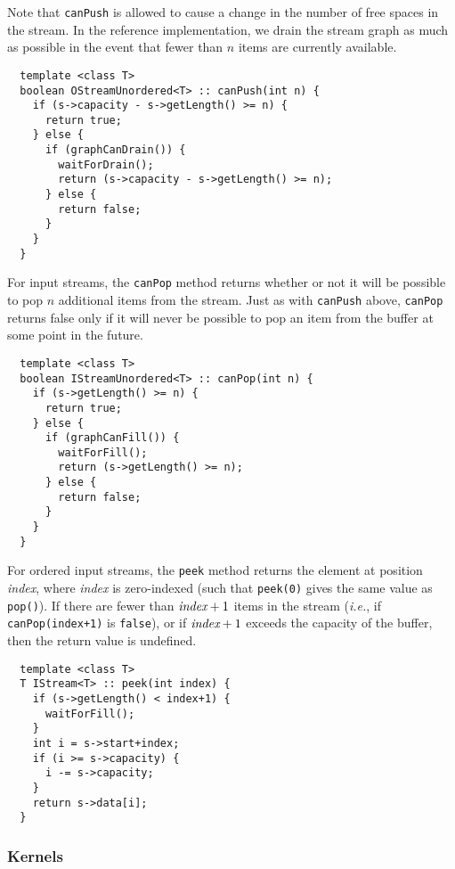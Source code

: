 Note that {\tt canPush} is allowed to cause a change in the number of
free spaces in the stream.  In the reference implementation, we drain
the stream graph as much as possible in the event that fewer than $n$
items are currently available.

{\small
\begin{verbatim}
  template <class T>
  boolean OStreamUnordered<T> :: canPush(int n) {
    if (s->capacity - s->getLength() >= n) {
      return true;
    } else {
      if (graphCanDrain()) {
        waitForDrain();
        return (s->capacity - s->getLength() >= n);
      } else {
        return false;
      }
    }
  }
\end{verbatim}}

 For input streams, the {\tt canPop} method returns
whether or not it will be possible to pop $n$ additional items from
the stream.  Just as with {\tt canPush} above, {\tt canPop} returns
false only if it will never be possible to pop an item from the buffer
at some point in the future.

{\small
\begin{verbatim}
  template <class T>
  boolean IStreamUnordered<T> :: canPop(int n) {
    if (s->getLength() >= n) {
      return true;
    } else {
      if (graphCanFill()) {
        waitForFill();
        return (s->getLength() >= n);
      } else {
        return false;
      }
    }
  }
\end{verbatim}}

 For ordered input streams, the {\tt peek} method returns
the element at position {\it index}, where {\it index} is zero-indexed
(such that {\tt peek(0)} gives the same value as {\tt pop()}).  If
there are fewer than $\mbox{\it index}+1$ items in the stream ({\it i.e.},
if {\tt canPop(index+1)} is {\tt false}), or if $\mbox{\it index}+1$ exceeds
the capacity of the buffer, then the return value is undefined.

{\small
\begin{verbatim}
  template <class T>
  T IStream<T> :: peek(int index) {
    if (s->getLength() < index+1) {
      waitForFill();
    }
    int i = s->start+index;
    if (i >= s->capacity) {
      i -= s->capacity;
    }
    return s->data[i];
  }
\end{verbatim}}

\subsubsection{Kernels}
\label{sec:kernels}

